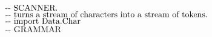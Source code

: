 \documentclass{article}
\begin{document}
\begin{tabbing}
${}$\\
${}$\\
${}$\\
${}$\\
${}$\\
${}$\\
${}$\\
${}$\\
${\mbox{\qquad-{}-  SCANNER.}}$\\
${\mbox{\qquad-{}-  turns a stream of characters into a stream of tokens.}}$\\
${}$\\
${\mbox{\qquad-{}-  import Data.Char}}$\\
${}$\\
${}$\\
${}$\\
${}$\\
${}$\\
${}$\\
${}$\\
${}$\\
${}$\\
${}$\\
${}$\\
${}$\\
${}$\\
${}$\\
${}$\\
${}$\\
${}$\\
${}$\\
${}$\\
${}$\\
${}$\\
${}$\\
${}$\\
${}$\\
${}$\\
${}$\\
${}$\\
${}$\\
${}$\\
${}$\\
${}$\\
${\mbox{\qquad-{}-  GRAMMAR}}$\\
${}$\\
${}$\\
${}$\\
${}$\\
${}$\\
${}$\\
${}$\\
${}$\\

\end{tabbing}
\end{document}
